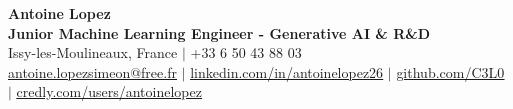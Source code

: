 \documentclass[letterpaper,10pt]{article}
\begin{document}
\begin{center}
    {\Huge \textbf{Antoine Lopez}} \\ \vspace{2pt}
    {\large \textbf{Junior Machine Learning Engineer - Generative AI \& R\&D}} \\ \vspace{3pt}
    \small
    Issy-les-Moulineaux, France $|$ +33 6 50 43 88 03 \\
    \href{mailto:antoine.lopezsimeon@free.fr}{\underline{antoine.lopezsimeon@free.fr}} $|$ 
    \href{https://linkedin.com/in/antoinelopez26}{\underline{linkedin.com/in/antoinelopez26}} $|$
    \href{https://github.com/C3L0}{\underline{github.com/C3L0}} $|$
    \href{https://www.credly.com/users/antoinelopez26}{\underline{credly.com/users/antoinelopez}}
\end{center}

\vspace{-10pt}







\end{document}
